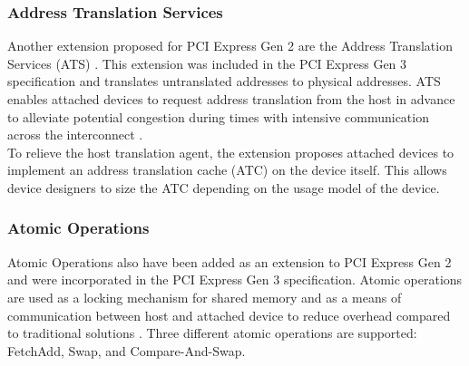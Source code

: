 


\subsubsection{Address Translation Services}
Another extension proposed for PCI Express Gen 2 are the Address Translation Services (ATS) \cite{pcie-ats}. This extension was included in the PCI Express Gen 3 specification and translates untranslated addresses to physical addresses. ATS enables attached devices to request address translation from the host in advance to alleviate potential congestion during times with intensive communication across the interconnect \cite{pcie3-intel}.\\
To relieve the host translation agent, the extension proposes attached devices to implement an address translation cache (ATC) on the device itself. This allows device designers to size the ATC depending on the usage model of the device. 




\subsubsection{Atomic Operations}
Atomic Operations \cite{pcie-atomic} also have been added as an extension to PCI Express Gen 2 and were incorporated in the PCI Express Gen 3 specification. Atomic operations are used as a locking mechanism for shared memory and as a means of communication between host and attached device to reduce overhead compared to traditional solutions \cite{pcie3-intel}. Three different atomic operations are supported: FetchAdd, Swap, and Compare-And-Swap.

